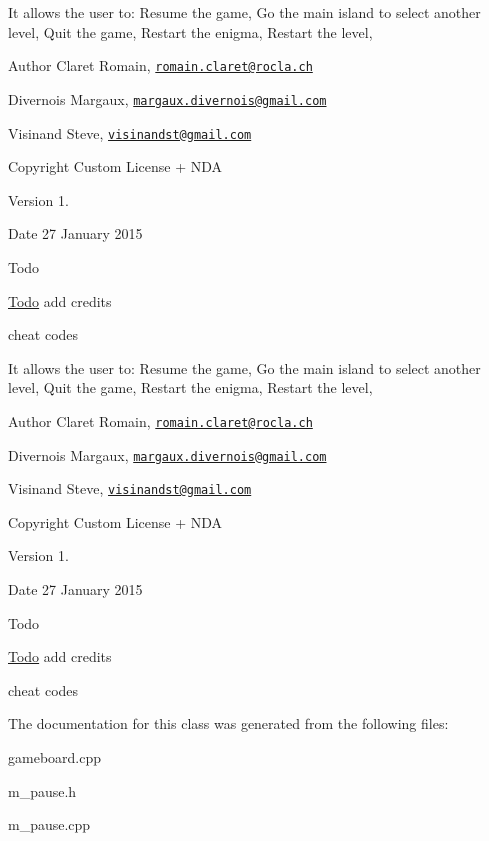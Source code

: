 It allows the user to\+: Resume the game, Go the main island to select another level, Quit the game, Restart the enigma, Restart the level, \begin{DoxyAuthor}{Author}
Claret Romain, \href{mailto:romain.claret@rocla.ch}{\tt romain.\+claret@rocla.\+ch} 

Divernois Margaux, \href{mailto:margaux.divernois@gmail.com}{\tt margaux.\+divernois@gmail.\+com} 

Visinand Steve, \href{mailto:visinandst@gmail.com}{\tt visinandst@gmail.\+com} 
\end{DoxyAuthor}
\begin{DoxyCopyright}{Copyright}
Custom License + N\+D\+A 
\end{DoxyCopyright}
\begin{DoxyVersion}{Version}
1. 
\end{DoxyVersion}
\begin{DoxyDate}{Date}
27 January 2015 
\end{DoxyDate}
\begin{DoxyRefDesc}{Todo}
\item[\hyperlink{todo__todo000008}{Todo}]add credits 

cheat codes \end{DoxyRefDesc}


It allows the user to\+: Resume the game, Go the main island to select another level, Quit the game, Restart the enigma, Restart the level, \begin{DoxyAuthor}{Author}
Claret Romain, \href{mailto:romain.claret@rocla.ch}{\tt romain.\+claret@rocla.\+ch} 

Divernois Margaux, \href{mailto:margaux.divernois@gmail.com}{\tt margaux.\+divernois@gmail.\+com} 

Visinand Steve, \href{mailto:visinandst@gmail.com}{\tt visinandst@gmail.\+com} 
\end{DoxyAuthor}
\begin{DoxyCopyright}{Copyright}
Custom License + N\+D\+A 
\end{DoxyCopyright}
\begin{DoxyVersion}{Version}
1. 
\end{DoxyVersion}
\begin{DoxyDate}{Date}
27 January 2015 
\end{DoxyDate}
\begin{DoxyRefDesc}{Todo}
\item[\hyperlink{todo__todo000028}{Todo}]add credits 

cheat codes \end{DoxyRefDesc}


The documentation for this class was generated from the following files\+:\begin{DoxyCompactItemize}
\item 
gameboard.\+cpp\item 
m\+\_\+pause.\+h\item 
m\+\_\+pause.\+cpp\end{DoxyCompactItemize}
